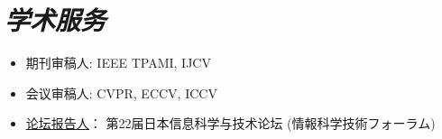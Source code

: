 \documentclass[UTF8]{ctexart}
\begin{document}
	

	
	
	\section{\textit{\textbf{学术服务}}}
	\begin{itemize}
		\item 期刊审稿人: IEEE TPAMI, IJCV
		\item 会议审稿人: CVPR, ECCV, ICCV
		\item \href{https://gakkai-web.net/fit/program_web/event_TCS4-2.html}{\underline{论坛报告人}}： 第22届日本信息科学与技术论坛 (情報科学技術フォーラム) 
	\end{itemize}
\end{document}
